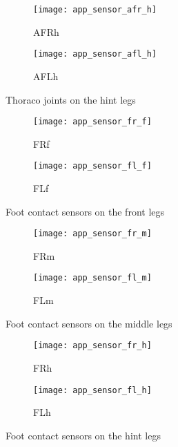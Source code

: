 \begin{figure}[H]
\centering
\begin{subfigure}{0.48\textwidth}
  \centering
  \texttt{[image: app\_sensor\_afr\_h]}
  \caption{AFRh}
  \label{fig:app_afr_h}
\end{subfigure}
\begin{subfigure}{0.48\textwidth}
  \centering
  \texttt{[image: app\_sensor\_afl\_h]}
  \caption{AFLh}
  \label{fig:app_afl_h}
\end{subfigure}
\caption{Thoraco joints on the hint legs}
\label{fig:app_af_h}
\end{figure}

\begin{figure}[H]
\centering
\begin{subfigure}{0.48\textwidth}
  \centering
  \texttt{[image: app\_sensor\_fr\_f]}
  \caption{FRf}
  \label{fig:app_fr_f}
\end{subfigure}
\begin{subfigure}{0.48\textwidth}
  \centering
  \texttt{[image: app\_sensor\_fl\_f]}
  \caption{FLf}
  \label{fig:app_fl_f}
\end{subfigure}
\caption{Foot contact sensors on the front legs}
\label{fig:app_f_f}
\end{figure}

\begin{figure}[H]
\centering
\begin{subfigure}{0.48\textwidth}
  \centering
  \texttt{[image: app\_sensor\_fr\_m]}
  \caption{FRm}
  \label{fig:app_fr_m}
\end{subfigure}
\begin{subfigure}{0.48\textwidth}
  \centering
  \texttt{[image: app\_sensor\_fl\_m]}
  \caption{FLm}
  \label{fig:app_fl_m}
\end{subfigure}
\caption{Foot contact sensors on the middle legs}
\label{fig:app_f_m}
\end{figure}

\begin{figure}[H]
\centering
\begin{subfigure}{0.48\textwidth}
  \centering
  \texttt{[image: app\_sensor\_fr\_h]}
  \caption{FRh}
  \label{fig:app_fr_h}
\end{subfigure}
\begin{subfigure}{0.48\textwidth}
  \centering
  \texttt{[image: app\_sensor\_fl\_h]}
  \caption{FLh}
  \label{fig:app_fl_h}
\end{subfigure}
\caption{Foot contact sensors on the hint legs}
\label{fig:app_f_h}
\end{figure}

